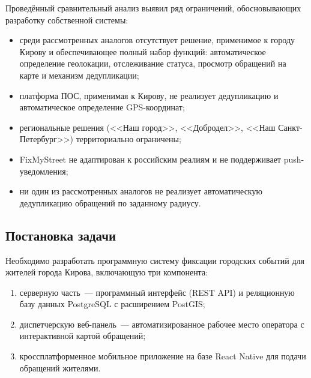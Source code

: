 Проведённый сравнительный анализ выявил ряд ограничений, обосновывающих разработку собственной системы:
\begin{itemize}
    \item среди рассмотренных аналогов отсутствует решение, применимое к городу Кирову и обеспечивающее полный набор функций: автоматическое определение геолокации, отслеживание статуса, просмотр обращений на карте и механизм дедупликации;
    \item платформа ПОС, применимая к Кирову, не реализует дедупликацию и автоматическое определение GPS-координат;
    \item региональные решения (<<Наш город>>, <<Добродел>>, <<Наш Санкт-Петербург>>) территориально ограничены;
    \item FixMyStreet не адаптирован к российским реалиям и не поддерживает push-уведомления;
    \item ни один из рассмотренных аналогов не реализует автоматическую дедупликацию обращений по заданному радиусу.
\end{itemize}

\subsection{Постановка задачи}

Необходимо разработать программную систему фиксации городских событий для жителей города Кирова, включающую три компонента:
\begin{enumerate}
    \item серверную часть~--- программный интерфейс (REST API) и реляционную базу данных PostgreSQL с расширением PostGIS;
    \item диспетчерскую веб-панель~--- автоматизированное рабочее место оператора с интерактивной картой обращений;
    \item кроссплатформенное мобильное приложение на базе React Native для подачи обращений жителями.
\end{enumerate}

